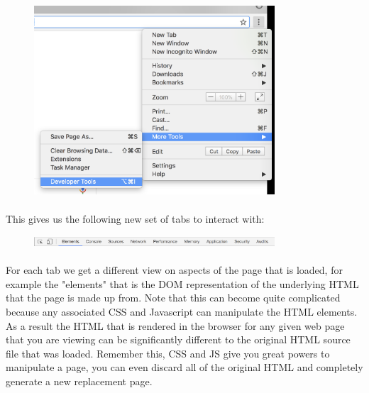 \begin{figure}[H]
\centering
\includegraphics[width=0.8\textwidth]{figures/devtools.png}
\label{fig:devtools}
\end{figure}


\paragraph{} This gives us the following new set of tabs to interact with:

\begin{figure}[H]
\centering
\includegraphics[width=0.8\textwidth]{figures/devtools_toolbar.png}
\label{fig:devtools_toolbar}
\end{figure}


\paragraph{} For each tab we get a different view on aspects of the page that is loaded, for example the "elements" that is the DOM representation of the underlying HTML that the page is made up from. Note that this can become quite complicated because any associated CSS and Javascript can manipulate the HTML elements. As a result the HTML that is rendered in the browser for any given web page that you are viewing can be significantly different to the original HTML source file that was loaded. Remember this, CSS and JS give you great powers to manipulate a page, you can even discard all of the original HTML and completely generate a new replacement page.



